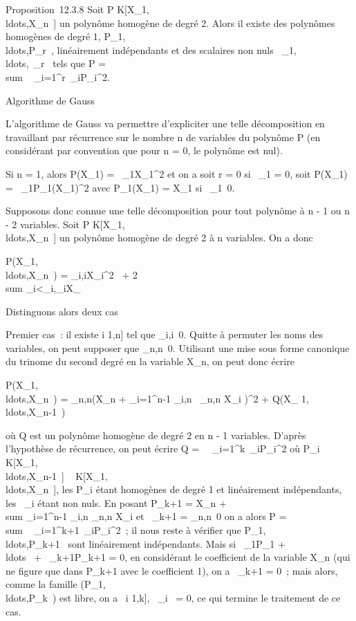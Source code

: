 \documentclass[]{article}
\begin{document}
Proposition~12.3.8 Soit P \in
K{[}X\_1,\\ldots,X\_n~{]}
un polynôme homogène de degré 2. Alors il existe des polynômes homogènes
de degré 1,
P\_1,\\ldots,P\_r~,
linéairement indépendants et des scalaires non nuls
\alpha~\_1,\\ldots,\alpha~\_r~
tels que P = \\sum ~
\_i=1^r\alpha~\_iP\_i^2.

Algorithme de Gauss

L'algorithme de Gauss va permettre d'expliciter une telle décomposition
en travaillant par récurrence sur le nombre n de variables du polynôme P
(en considérant par convention que pour n = 0, le polynôme est nul).

Si n = 1, alors P(X\_1) = \alpha~\_1X\_1^2 et
on a soit r = 0 si \alpha~\_1 = 0, soit P(X\_1) =
\alpha~\_1P\_1(X\_1)^2 avec
P\_1(X\_1) = X\_1 si
\alpha~\_1\neq~0.

Supposons donc connue une telle décomposition pour tout polynôme à n - 1
ou n - 2 variables. Soit P \in
K{[}X\_1,\\ldots,X\_n~{]}
un polynôme homogène de degré 2 à n variables. On a donc

P(X\_1,\\ldots,X\_n~)
= \sum \omega\_i,iX\_i^2~ +
2\\sum
\_i\textless{}\jmath\omega\_i,\jmathX\_iX\_\jmath

Distinguons alors deux cas

Premier cas~: il existe i \in {[}1,n{]} tel que
\omega\_i,i\neq~0. Quitte à permuter les noms
des variables, on peut supposer que
\omega\_n,n\neq~0. Utilisant une mise sous
forme canonique du trinome du second degré en la variable X\_n,
on peut donc écrire

P(X\_1,\\ldots,X\_n~)
= \omega\_n,n\left (X\_n +
\sum \_i=1^n-1 \omega\_i,n~
\over \omega\_n,n X\_i\right
)^2 + Q(X\_
1,\\ldots,X\_n-1~)

où Q est un polynôme homogène de degré 2 en n - 1 variables. D'après
l'hypothèse de récurrence, on peut écrire Q =\
\sum ~
\_i=1^k\alpha~\_iP\_i^2 où P\_i \in
K{[}X\_1,\\ldots,X\_n-1~{]}
\subset~
K{[}X\_1,\\ldots,X\_n~{]},
les P\_i étant homogènes de degré 1 et linéairement
indépendants, les \alpha~\_i étant non nuls. En posant P\_k+1
= X\_n +\ \\sum
 \_i=1^n-1 \omega\_i,n \over
\omega\_n,n X\_i et \alpha~\_k+1 =
\omega\_n,n\neq~0 on a alors P
= \\sum ~
\_i=1^k+1\alpha~\_iP\_i^2~; il nous reste
à vérifier que
P\_1,\\ldots,P\_k+1~
sont linéairement indépendants. Mais si \lambda~\_1P\_1 +
\\ldots~ +
\lambda~\_k+1P\_k+1 = 0, en considérant le coefficient de la
variable X\_n (qui ne figure que dans P\_k+1 avec le
coefficient 1), on a \lambda~\_k+1 = 0~; mais alors, comme la famille
(P\_1,\\ldots,P\_k~)
est libre, on a \forall~i \in {[}1,k{]}, \lambda~\_i~ =
0, ce qui termine le traitement de ce cas.
\end{document}
